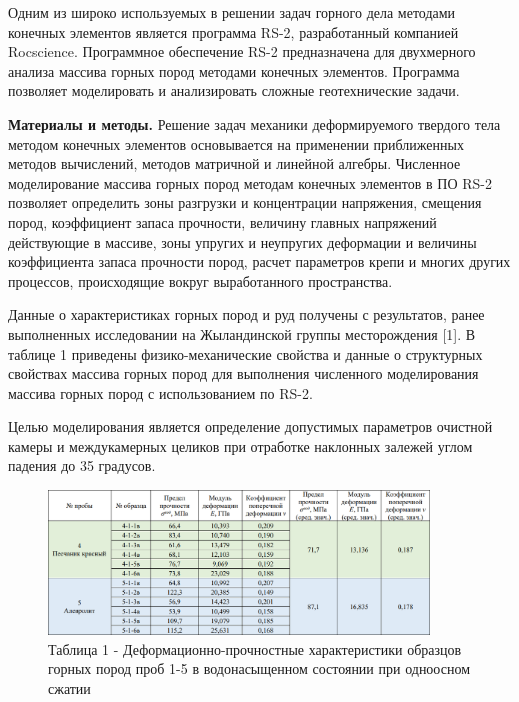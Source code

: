 \begin{multicols}{2}
Одним из широко используемых в решении задач горного дела методами
конечных элементов является программа RS-2, разработанный компанией
Rocscience. Программное обеспечение RS-2 предназначена для двухмерного
анализа массива горных пород методами конечных элементов. Программа
позволяет моделировать и анализировать сложные геотехнические задачи.

{\bfseries Материалы и методы.} Решение задач механики деформируемого
твердого тела методом конечных элементов основывается на применении
приближенных методов вычислений, методов матричной и линейной алгебры.
Численное моделирование массива горных пород методам конечных элементов
в ПО RS-2 позволяет определить зоны разгрузки и концентрации напряжения,
смещения пород, коэффициент запаса прочности, величину главных
напряжений действующие в массиве, зоны упругих и неупругих деформации и
величины коэффициента запаса прочности пород, расчет параметров крепи и
многих других процессов, происходящие вокруг выработанного пространства.

Данные о характеристиках горных пород и руд получены с результатов,
ранее выполненных исследовании на Жыландинской группы месторождения
{[}1{]}. В таблице 1 приведены физико-механические свойства и данные о
структурных свойствах массива горных пород для выполнения численного
моделирования массива горных пород с использованием по RS-2.

Целью моделирования является определение допустимых параметров очистной
камеры и междукамерных целиков при отработке наклонных залежей углом
падения до 35 градусов.
\end{multicols}

\begin{figure}[H]
\caption*{Таблица 1 - Деформационно-прочностные характеристики образцов горных пород проб 1-5 в водонасыщенном состоянии при одноосном сжатии}
	\centering
	\includegraphics[width=0.9\textwidth]{assets/281}
\end{figure}

